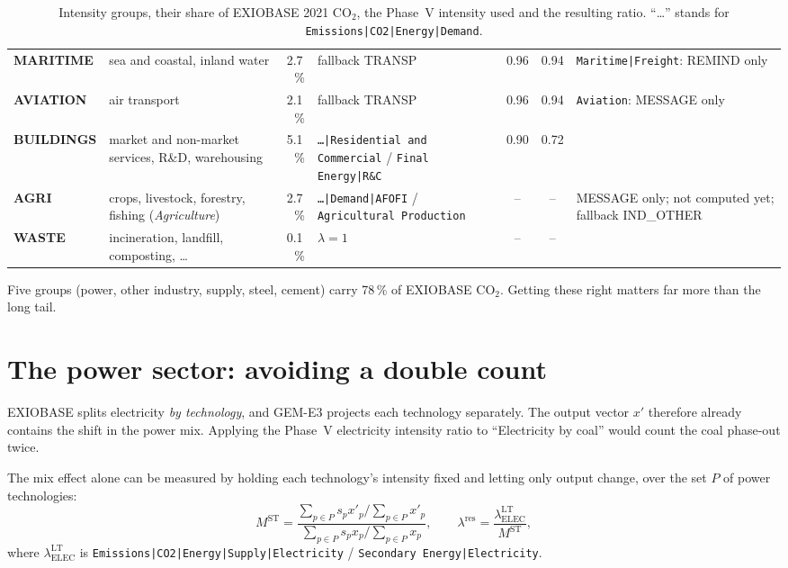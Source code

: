 \documentclass[11pt,a4paper]{article}
\newcommand{\var}[1]{\texttt{#1}}
\begin{document}
\begin{table}[h]
\begin{tabularx}{\textwidth}{@{}>{\bfseries}p{1.7cm} L r p{4.3cm} cc p{2.6cm}@{}}
MARITIME & sea and coastal, inland water & 2.7\,\% & fallback TRANSP & 0.96 & 0.94 & \var{Maritime|Freight}: REMIND only\\
AVIATION & air transport & 2.1\,\% & fallback TRANSP & 0.96 & 0.94 & \var{Aviation}: MESSAGE only\\
BUILDINGS & market and non-market services, R\&D, warehousing & 5.1\,\% & \var{\dots|Residential and Commercial} / \var{Final Energy|R\&C} & 0.90 & 0.72 & \\
AGRI & crops, livestock, forestry, fishing (\emph{Agriculture}) & 2.7\,\% & \var{\dots|Demand|AFOFI} / \var{Agricultural Production} & -- & -- & MESSAGE only; not computed yet; fallback IND\_OTHER\\
WASTE & incineration, landfill, composting, \dots & 0.1\,\% & $\lambda = 1$ & -- & -- & \\
\bottomrule
\end{tabularx}
\caption{Intensity groups, their share of EXIOBASE 2021 CO$_2$, the Phase~V
intensity used and the resulting ratio. ``\dots'' stands for
\var{Emissions|CO2|Energy|Demand}.}
\label{tab:sectors}
\end{table}

Five groups (power, other industry, supply, steel, cement) carry 78\,\% of
EXIOBASE CO$_2$. Getting these right matters far more than the long tail.

\section{The power sector: avoiding a double count}
\label{sec:power}

EXIOBASE splits electricity \emph{by technology}, and GEM-E3 projects each
technology separately. The output vector $x'$ therefore already contains the
shift in the power mix. Applying the Phase~V electricity intensity ratio to
``Electricity by coal'' would count the coal phase-out twice.

The mix effect alone can be measured by holding each technology's intensity
fixed and letting only output change, over the set $P$ of power technologies:
\begin{equation}
  M^{\mathrm{ST}} = \frac{\sum_{p\in P} s_p x'_p \big/ \sum_{p\in P} x'_p}
                         {\sum_{p\in P} s_p x_p  \big/ \sum_{p\in P} x_p},
  \qquad
  \lambda^{\mathrm{res}} = \frac{\lambda^{\mathrm{LT}}_{\mathrm{ELEC}}}{M^{\mathrm{ST}}},
\end{equation}
where $\lambda^{\mathrm{LT}}_{\mathrm{ELEC}}$ is
\var{Emissions|CO2|Energy|Supply|Electricity} / \var{Secondary Energy|Electricity}.
\end{document}
